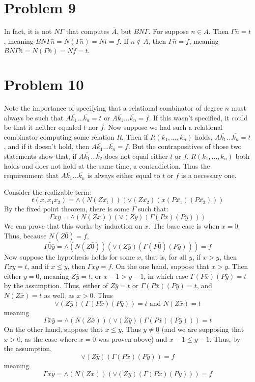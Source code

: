 \documentclass{article}
\theoremstyle{definition}
\begin{document}
\section*{Problem 9}
In fact, it is not $N\Gamma$ that computes $\bar{A}$, but $BN\Gamma$. For suppose $n\in A$. Then $\Gamma\bar{n}=t$, meaning 
$BN\Gamma\bar{n}=N(\Gamma\bar{n})=Nt=f$. If $n\notin A$, then $\Gamma\bar{n}=f$, meaning $BN\Gamma\bar{n}=N(\Gamma\bar{n})=Nf=t$.

\section*{Problem 10}
Note the importance of specifying that a relational combinator of degree $n$ must always be such that 
$A\overline{k_1}...\overline{k_n}=t$ or $A\overline{k_1}...\overline{k_n}=f$. If this wasn't specified, it could be that it neither equaled $t$ nor $f$. Now suppose we had such a relational 
combinator computing some relation $R$. Then if $R(k_1,...,k_n)$ holds, $A\overline{k_1}...\overline{k_n}=t$, and if it doesn't hold, then 
$A\overline{k_1}...\overline{k_n}=f$. But the contrapositives of those two statements show that, if $A\overline{k_1}...\overline{k_2}$ does not equal either $t$ or $f$, 
$R(k_1,...,k_n)$ both holds and does not hold at the same time, a contradiction. Thus the requirenment that $A\overline{k_1}...\overline{k_n}$ is always either equal to $t$ or $f$ is a necessary one.


Consider the realizable term: \[ t(x,x_1x_2)=\wedge (N(Z\overline{x_1}))(\vee (Z\overline{x_2})(x(P\overline{x_1})(P\overline{x_2}))) \]
By the fixed point theorem, there is some $\Gamma$ such that:
\[ \Gamma\bar{x}\bar{y}=\wedge (N(Z\bar{x}))(\vee (Z\bar{y})(\Gamma(P\bar{x})(P\bar{y}))) \]
We can prove that this works by induction on $x$. The base case is when $x=0$. Thus, because $N(Z\bar{0})=f$, 
\[ \Gamma\bar{0}\bar{y}=\wedge (N(Z\bar{0}))(\vee (Z\bar{y})(\Gamma(P\bar{0})(P\bar{y})))=f \]
Now suppose the hypothesis holds for some $x$, that is, for all $y$, if $x>y$, then $\Gamma xy=t$, and if $x\le y$, then $\Gamma xy=f$. On the one hand, suppose that 
$x>y$. Then either $y=0$, meaning $Z\bar{y}=t$, or $x-1>y-1$, in which case $\Gamma(P\bar{x})(P\bar{y})=t$ by the assumption. Thus, either of 
$Z\bar{y}=t$ or $\Gamma(P\bar{x})(P\bar{y})=t$, and $N(Z\bar{x})=t$ as well, as $x>0$. Thus
\[ \vee (Z\bar{y})(\Gamma(P\bar{x})(P\bar{y}))=t\textrm{ and }N(Z\bar{x})=t \] meaning
\[ \Gamma\bar{x}\bar{y}=\wedge (N(Z\bar{x}))(\vee (Z\bar{y})(\Gamma(P\bar{x})(P\bar{y})))=t \] On the other hand, suppose that $x\le y$. Thus $y\ne 0$ (and we are supposing that $x>0$, as the 
case where $x=0$ was proven above) and $x-1\le y-1$. Thus, by the assumption, \[ \vee(Z\bar{y})(\Gamma(P\bar{x})(P\bar{y}))=f \] 
meaning
\[ \Gamma\bar{x}\bar{y}=\wedge (N(Z\bar{x}))(\vee (Z\bar{y})(\Gamma(P\bar{x})(P\bar{y})))=f \] 
\end{document}

